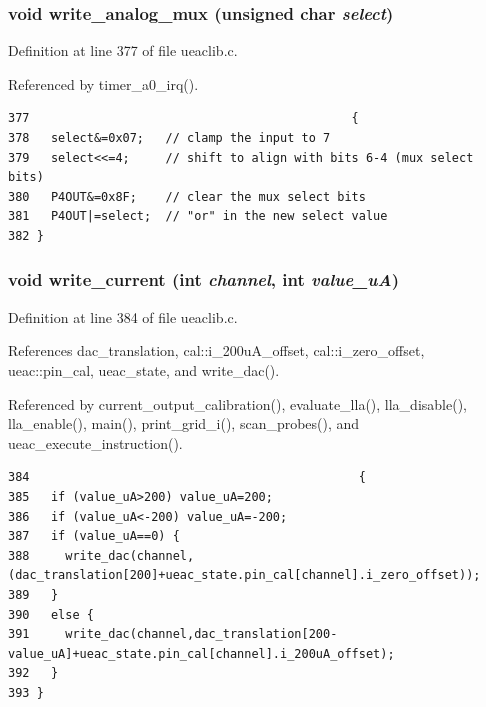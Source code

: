 \subsubsection{\setlength{\rightskip}{0pt plus 5cm}void write\_\-analog\_\-mux (unsigned char {\em select})}\label{ueaclib_8c_a19}




Definition at line 377 of file ueaclib.c.

Referenced by timer\_\-a0\_\-irq().

\footnotesize\begin{verbatim}377                                             {
378   select&=0x07;   // clamp the input to 7 
379   select<<=4;     // shift to align with bits 6-4 (mux select bits)
380   P4OUT&=0x8F;    // clear the mux select bits
381   P4OUT|=select;  // "or" in the new select value
382 }
\end{verbatim}\normalsize 


\subsubsection{\setlength{\rightskip}{0pt plus 5cm}void write\_\-current (int {\em channel}, int {\em value\_\-u\-A})}\label{ueaclib_8c_a20}




Definition at line 384 of file ueaclib.c.

References dac\_\-translation, cal::i\_\-200u\-A\_\-offset, cal::i\_\-zero\_\-offset, ueac::pin\_\-cal, ueac\_\-state, and write\_\-dac().

Referenced by current\_\-output\_\-calibration(), evaluate\_\-lla(), lla\_\-disable(), lla\_\-enable(), main(), print\_\-grid\_\-i(), scan\_\-probes(), and ueac\_\-execute\_\-instruction().

\footnotesize\begin{verbatim}384                                              {
385   if (value_uA>200) value_uA=200;
386   if (value_uA<-200) value_uA=-200;
387   if (value_uA==0) {
388     write_dac(channel,(dac_translation[200]+ueac_state.pin_cal[channel].i_zero_offset));
389   }
390   else {
391     write_dac(channel,dac_translation[200-value_uA]+ueac_state.pin_cal[channel].i_200uA_offset);
392   }
393 }
\end{verbatim}\normalsize 




